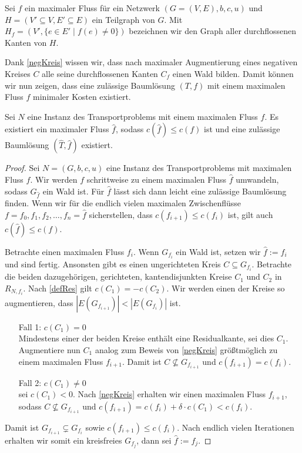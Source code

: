 \begin{nota}Sei $f$ ein maximaler Fluss für ein Netzwerk $(G=(V,E),b,c,u)$ und $H=(V'\subseteq V, E'\subseteq E)$ ein Teilgraph von $G$. Mit $H_f=(V',\{e\in E' \mid f(e) \neq 0\})$ bezeichnen wir den Graph aller durchflossenen Kanten von $H$.\end{nota}

Dank \cref{negKreis} wissen wir, dass nach maximaler Augmentierung eines negativen Kreises $C$ alle seine durchflossenen Kanten $C_f$ einen Wald bilden. Damit können wir nun zeigen, dass eine zulässige Baumlösung $(T,f)$ mit einem maximalen Fluss $f$ minimaler Kosten existiert.

\begin{thm}\label{BLex}Sei $N$ eine Instanz des Transportproblems mit einem maximalen Fluss $f$. Es existiert ein maximaler Fluss $\hat{f}$, sodass $c(\hat{f})\leq c(f)$ ist und eine zulässige Baumlösung $(\hat{T},\hat{f})$ existiert.\end{thm}
\begin{proof}Sei $N=(G,b,c,u)$ eine Instanz des Transportproblems mit maximalen Fluss $f$. Wir werden $f$ schrittweise zu einem maximalen Fluss $\hat{f}$ umwandeln, sodass $G_{\hat{f}}$ ein Wald ist. Für $\hat{f}$ lässt sich dann leicht eine zulässige Baumlösung finden. Wenn wir für die endlich vielen maximalen Zwischenflüsse $f=f_0,f_1,f_2,\ldots,f_n=\hat{f}$ sicherstellen, dass $c(f_{i+1})\leq c(f_i)$ ist, gilt auch $c(\hat{f})\leq c(f)$.

Betrachte einen maximalen Fluss $f_i$. Wenn $G_{f_i}$ ein Wald ist, setzen wir $\hat{f}:=f_i$ und sind fertig. Ansonsten gibt es einen ungerichteten Kreis $C\subseteq G_{f_i}$. Betrachte die beiden dazugehörigen, gerichteten, kantendisjunkten Kreise $C_1$ und $C_2$ in $R_{N,f_i}$. Nach \cref{defRes} gilt $c(C_1)=-c(C_2)$. Wir werden einen der Kreise so augmentieren, dass $|E(G_{f_{i+1}})|<|E(G_{f_i})|$ ist.
\begin{itemize}[leftmargin=!,labelwidth=]
\item[Fall 1:] $c(C_1)=0$\\
	Mindestens einer der beiden Kreise enthält eine Residualkante, sei dies \obda $C_1$. Augmentiere nun $C_1$ analog zum Beweis von \cref{negKreis} größtmöglich zu einem maximalen Fluss $f_{i+1}$. Damit ist $C\nsubseteq G_{f_{i+1}}$ und $c(f_{i+1}) = c(f_i)$.
\item[Fall 2:] $c(C_1)\neq0$\\
	\Obda sei $c(C_1)<0$. Nach \cref{negKreis} erhalten wir einen maximalen Fluss $f_{i+1}$, sodass $C\nsubseteq G_{f_{i+1}}$ und $c(f_{i+1}) = c(f_i) + \delta\cdot c(C_1)<c(f_i)$.
\end{itemize}

Damit ist $G_{f_{i+1}}\subsetneq G_{f_i}$ sowie $c(f_{i+1})\leq c(f_i)$. Nach endlich vielen Iterationen erhalten wir somit ein kreisfreies $G_{f_j}$, dann sei $\hat{f}:=f_j$.
\end{proof}

